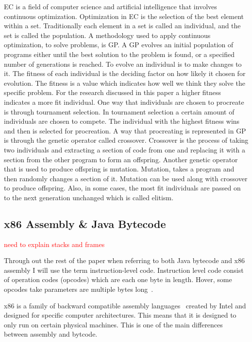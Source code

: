 \documentclass{sig-alternate}
\newcommand{\mycomment}[1]{\textcolor{red}{#1}}
\begin{document}
EC is a field of computer science and artificial intelligence that involves continuous optimization. Optimization in EC is the selection of the best element within a set. Traditionally each element in a set is called an individual, and the set is called the population. A methodology used to apply continuous optimization, to solve problems, is GP. A GP evolves an initial population of programs either until the best solution to the problem is found, or a specified number of generations is reached. To evolve an individual is to make changes to it. The fitness of each individual is the deciding factor on how likely it chosen for evolution. The fitness is a value which indicates how well we think they solve the specific problem. For the research discussed in this paper a higher fitness indicates a more fit individual. One way that individuals are chosen to procreate is through tournament selection. In tournament selection a certain amount of individuals are chosen to compete. The individual with the highest fitness wins and then is selected for procreation. A way that procreating is represented in GP is through the genetic operator called crossover. Crossover is the process of taking two individuals and extracting a section of code from one and replacing it with a section from the other program to form an offspring. Another genetic operator that is used to produce offspring is mutation. Mutation, takes a program and then randomly changes a section of it. Mutation can be used along with crossover to produce offspring. Also, in some cases, the most fit individuals are passed on to the next generation unchanged which is called elitism.


\subsection{x86 Assembly \& Java Bytecode}

\mycomment{need to explain stacks and frames}

Through out the rest of the paper when referring to both Java bytecode and x86 assembly I will use the term instruction-level code. Instruction level code consist of operation codes (opcodes) which are each one byte in length. Hover, some opcodes take parameters are multiple bytes long~\cite{JavaBytecode:2014,x86tomachine:2013}.

x86 is a family of backward compatible assembly languages~\cite{x86:2014} created by Intel and designed for specific computer architectures. This means that it is designed to only run on certain physical machines. This is one of the main differences between assembly and bytcode. 
\end{document}
